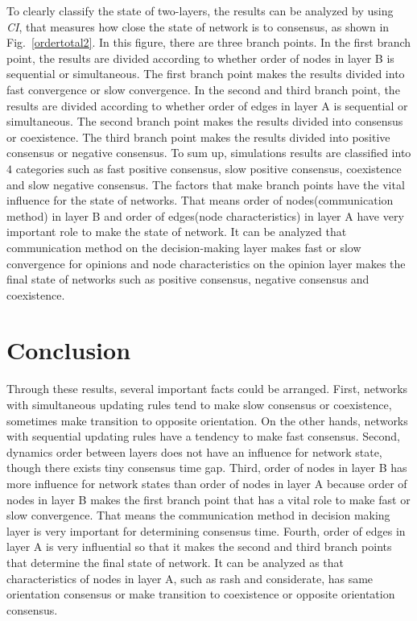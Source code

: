 To clearly classify the state of two-layers, the results can be analyzed by using \textit{CI}, that measures how close the state of network is to consensus, as shown in Fig.~\ref{ordertotal2}. In this figure, there are three branch points. In the first branch point, the results are divided according to whether order of nodes in layer B is sequential or simultaneous. The first branch point makes the results divided into fast convergence or slow convergence. In the second and third branch point, the results are divided according to whether order of edges in layer A is sequential or simultaneous. The second branch point makes the results divided into consensus or coexistence. The third branch point makes the results divided into positive consensus or negative consensus. To sum up, simulations results are classified into $4$ categories such as fast positive consensus, slow positive consensus, coexistence and slow negative consensus. The factors that make branch points have the vital influence for the state of networks. That means order of nodes(communication method) in layer B and order of edges(node characteristics) in layer A have very important role to make the state of network. It can be analyzed that communication method on the decision-making layer makes fast or slow convergence for opinions and node characteristics on the opinion layer makes the final state of networks such as positive consensus, negative consensus and coexistence. \\

\section{Conclusion}
Through these results, several important facts could be arranged. First, networks with simultaneous updating rules tend to make slow consensus or coexistence, sometimes make transition to opposite orientation. On the other hands, networks with sequential updating rules have a tendency to make fast consensus. Second, dynamics order between layers does not have an influence for network state, though there exists tiny consensus time gap. Third, order of nodes in layer B has more influence for network states than order of nodes in layer A because order of nodes in layer B makes the first branch point that has a vital role to make fast or slow convergence. That means the communication method in decision making layer is very important for determining consensus time. Fourth, order of edges in layer A is very influential so that it makes the second and third branch points that determine the final state of network. It can be analyzed as that characteristics of nodes in layer A, such as rash and considerate, has same orientation consensus or make transition to coexistence or opposite orientation consensus.\\



